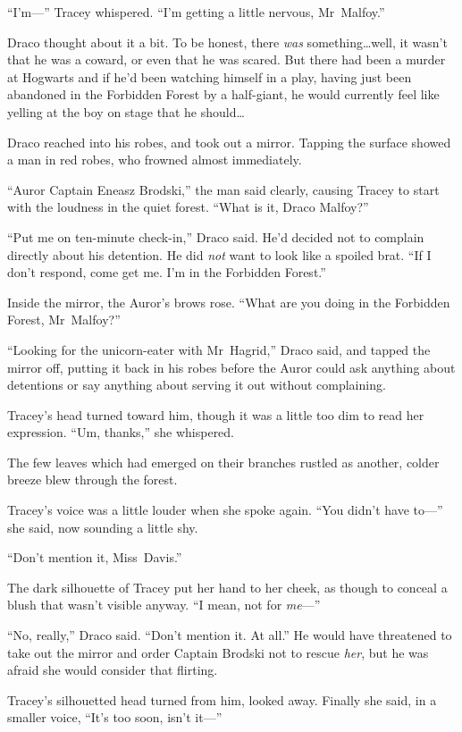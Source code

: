 “I’m—” Tracey whispered. “I’m getting a little nervous, Mr~Malfoy.”

Draco thought about it a bit. To be honest, there \emph{was} something…well, it wasn’t that he was a coward, or even that he was scared. But there had been a murder at Hogwarts and if he’d been watching himself in a play, having just been abandoned in the Forbidden Forest by a half-giant, he would currently feel like yelling at the boy on stage that he should…

Draco reached into his robes, and took out a mirror. Tapping the surface showed a man in red robes, who frowned almost immediately.

“Auror Captain Eneasz Brodski,” the man said clearly, causing Tracey to start with the loudness in the quiet forest. “What is it, Draco Malfoy?”

“Put me on ten-minute check-in,” Draco said. He’d decided not to complain directly about his detention. He did \emph{not} want to look like a spoiled brat. “If I don’t respond, come get me. I’m in the Forbidden Forest.”

Inside the mirror, the Auror’s brows rose. “What are you doing in the Forbidden Forest, Mr~Malfoy?”

“Looking for the unicorn-eater with Mr~Hagrid,” Draco said, and tapped the mirror off, putting it back in his robes before the Auror could ask anything about detentions or say anything about serving it out without complaining.

Tracey’s head turned toward him, though it was a little too dim to read her expression. “Um, thanks,” she whispered.

The few leaves which had emerged on their branches rustled as another, colder breeze blew through the forest.

Tracey’s voice was a little louder when she spoke again. “You didn’t have to—” she said, now sounding a little shy.

“Don’t mention it, Miss~Davis.”

The dark silhouette of Tracey put her hand to her cheek, as though to conceal a blush that wasn’t visible anyway. “I mean, not for \emph{me}—”

“No, really,” Draco said. “Don’t mention it. At all.” He would have threatened to take out the mirror and order Captain Brodski not to rescue \emph{her}, but he was afraid she would consider that flirting.

Tracey’s silhouetted head turned from him, looked away. Finally she said, in a smaller voice, “It’s too soon, isn’t it—”

